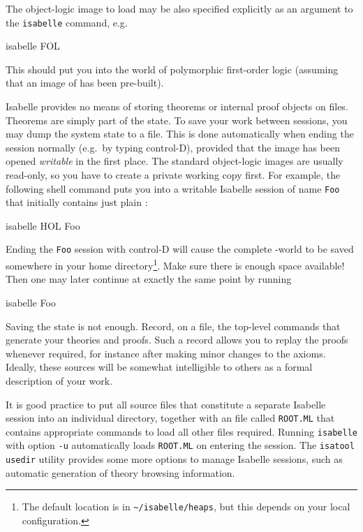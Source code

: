 \medskip

The object-logic image to load may be also specified explicitly as an argument
to the {\tt isabelle} command, e.g.
\begin{ttbox}
isabelle FOL
\end{ttbox}
This should put you into the world of polymorphic first-order logic (assuming
that an image of {\FOL} has been pre-built).

 Isabelle provides no means of storing
theorems or internal proof objects on files.  Theorems are simply part of the
\ML{} state.  To save your work between sessions, you may dump the \ML{}
system state to a file.  This is done automatically when ending the session
normally (e.g.\ by typing control-D), provided that the image has been opened
\emph{writable} in the first place.  The standard object-logic images are
usually read-only, so you have to create a private working copy first.  For
example, the following shell command puts you into a writable Isabelle session
of name \texttt{Foo} that initially contains just plain \HOL:
\begin{ttbox}
isabelle HOL Foo
\end{ttbox}
Ending the \texttt{Foo} session with control-D will cause the complete
\ML-world to be saved somewhere in your home directory\footnote{The default
  location is in \texttt{\~\relax/isabelle/heaps}, but this depends on your
  local configuration.}.  Make sure there is enough space available! Then one
may later continue at exactly the same point by running
\begin{ttbox}
isabelle Foo  
\end{ttbox}

\medskip Saving the {\ML} state is not enough.  Record, on a file, the
top-level commands that generate your theories and proofs.  Such a record
allows you to replay the proofs whenever required, for instance after making
minor changes to the axioms.  Ideally, these sources will be somewhat
intelligible to others as a formal description of your work.

It is good practice to put all source files that constitute a separate
Isabelle session into an individual directory, together with an {\ML} file
called \texttt{ROOT.ML} that contains appropriate commands to load all other
files required.  Running \texttt{isabelle} with option \texttt{-u}
automatically loads \texttt{ROOT.ML} on entering the session.  The
\texttt{isatool usedir} utility provides some more options to manage Isabelle
sessions, such as automatic generation of theory browsing information.

